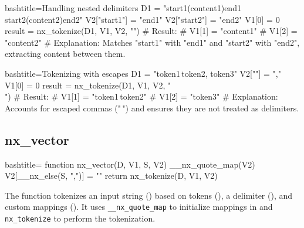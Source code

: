 \begin{NexCodeBox}{bash}{title={Handling nested delimiters}}
	D1 = "start1(content1)end1 start2(content2)end2"
	V2["start1"] = "end1"
	V2["start2"] = "end2"
	V1[0] = 0
	result = nx_tokenize(D1, V1, V2, "")
	# Result:
	# V1[1] = "content1"
	# V1[2] = "content2"
	# Explanation: Matches "start1" with "end1" and "start2" with "end2", extracting content between them.
\end{NexCodeBox}

\begin{NexCodeBox}{bash}{title={Tokenizing with escapes}}
	D1 = "token1\,token2, token3"
	V2[""] = ","
	V1[0] = 0
	result = nx_tokenize(D1, V1, V2, "\\")
	# Result:
	# V1[1] = "token1\,token2"
	# V1[2] = "token3"
	# Explanation: Accounts for escaped commas ("\,") and ensures they are not treated as delimiters.
\end{NexCodeBox}

\newpage
\subsection{nx_vector}
\label{nx_vector}
\begin{NexCodeBox}{bash}{title={}}
function nx_vector(D, V1, S, V2) {
	__nx_quote_map(V2)
	V2[__nx_else(S, ",")] = ""
	return nx_tokenize(D, V1, V2)
}
\end{NexCodeBox}

\begin{NexMainBox}
	\begin{NexMainBox}
		The  function tokenizes an input string () based on tokens (), a delimiter (), and custom mappings (). It uses \texttt{__nx_quote_map} to initialize mappings in  and \texttt{nx_tokenize} to perform the tokenization.
	\end{NexMainBox}
	\begin{NexMainBox}
		\begin{NexListDark}
		\end{NexListDark}
	\end{NexMainBox}
\end{NexMainBox}

